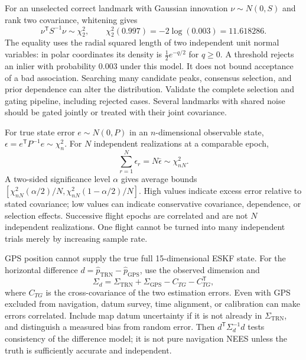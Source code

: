 For an unselected correct landmark with Gaussian innovation
$\nu\sim N(0,S)$ and rank two covariance, whitening gives
\begin{equation}
 \nu^{\mathsf T}S^{-1}\nu\sim\chi_2^2,\qquad
 \chi_2^2(0.997)=-2\log(0.003)=11.618286.
\end{equation}
The equality uses the radial squared length of two independent unit
normal variables: in polar coordinates its density is
$\tfrac12e^{-q/2}$ for $q\geq0$. A threshold rejects an inlier with
probability $0.003$ under this model. It does not bound acceptance of
a bad association. Searching many candidate peaks, consensus selection,
and prior dependence can alter the distribution. Validate the complete
selection and gating pipeline, including rejected cases. Several
landmarks with shared noise should be gated jointly or treated with
their joint covariance.

For true state error $e\sim N(0,P)$ in an $n$-dimensional observable
state, $\epsilon=e^{\mathsf T}P^{-1}e\sim\chi_n^2$. For $N$ independent
realizations at a comparable epoch,
\begin{equation}
 \sum_{r=1}^N\epsilon_r=N\overline\epsilon\sim\chi_{nN}^2.
\end{equation}
A two-sided significance level $\alpha$ gives average bounds
$[\chi_{nN}^2(\alpha/2)/N,
\chi_{nN}^2(1-\alpha/2)/N]$. High values indicate excess error relative
to stated covariance; low values can indicate conservative covariance,
dependence, or selection effects. Successive flight epochs are correlated
and are not $N$ independent realizations. One flight cannot be turned
into many independent trials merely by increasing sample rate.

GPS position cannot supply the true full 15-dimensional ESKF state.
For the horizontal difference $d=\widehat p_{\mathrm{TRN}}-
\widehat p_{\mathrm{GPS}}$, use the observed dimension and
\begin{equation}
 \Sigma_d=\Sigma_{\mathrm{TRN}}+\Sigma_{\mathrm{GPS}}
               -C_{TG}-C_{TG}^{\mathsf T},
\end{equation}
where $C_{TG}$ is the cross-covariance of the two estimation errors.
Even with GPS excluded from navigation, datum survey, time alignment,
or calibration can make errors correlated. Include map datum uncertainty
if it is not already in $\Sigma_{\mathrm{TRN}}$, and distinguish a measured
bias from random error. Then $d^{\mathsf T}\Sigma_d^{-1}d$ tests
consistency of the difference model; it is not pure navigation NEES
unless the truth is sufficiently accurate and independent.

